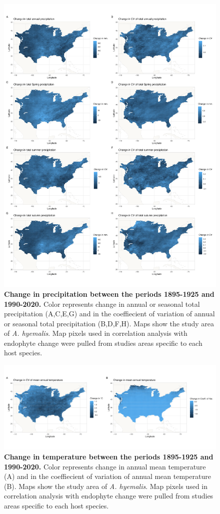 \documentclass[11pt]{article}
\begin{document}
	\begin{figure}[H]
	\centering
	\includegraphics[width = .8\linewidth]{ppt_change_maps.png}
	\caption{\textbf{Change in precipitation between the periods 1895-1925 and 1990-2020.} Color represents change in annual or seasonal total precipitation (A,C,E,G) and in the coeffiecient of variation of annual or seasonal total precipitation (B,D,F,H). Maps show the study area of \emph{A. hyemalis}. Map pixels used in correlation analysis with endophyte change were pulled from studies areas specific to each host species. }
\end{figure}

	
	\begin{figure}[H]
		\centering
		\includegraphics[width = \linewidth]{tmean_change_maps.png}
		\caption{\textbf{Change in temperature between the periods 1895-1925 and 1990-2020.} Color represents change in annual mean temperature (A) and in the coeffiecient of variation of annual mean temperature (B). Maps show the study area of \emph{A. hyemalis}. Map pixels used in correlation analysis with endophyte change were pulled from studies areas specific to each host species.}
	\end{figure}
\end{document}
